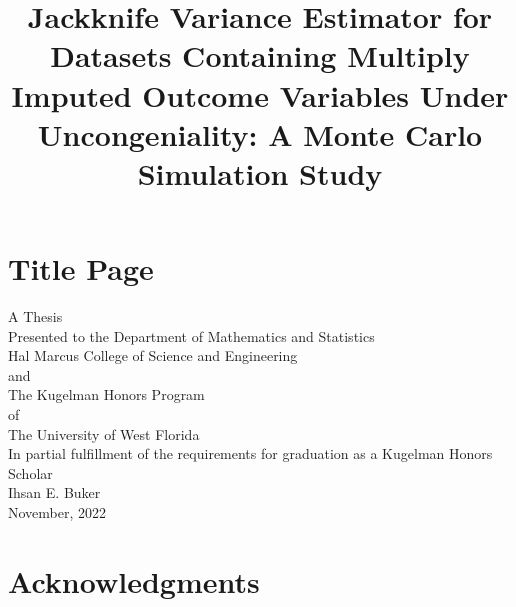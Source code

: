 \documentclass[
  letterpaper,
  DIV=11,
  numbers=noendperiod]{scrreprt}
\title{Jackknife Variance Estimator for Datasets Containing Multiply
Imputed Outcome Variables Under Uncongeniality: A Monte Carlo Simulation
Study}
\author{}
\date{}
\renewcommand*\contentsname{Table of contents}
\newcommand\contentsname{Table of contents}
\begin{document}
\maketitle
\ifdefined\Shaded\renewenvironment{Shaded}{\begin{tcolorbox}[frame hidden, breakable, borderline west={3pt}{0pt}{shadecolor}, enhanced, sharp corners, boxrule=0pt, interior hidden]}{\end{tcolorbox}}\fi

\renewcommand*\contentsname{Table of contents}
{
\setcounter{tocdepth}{2}
\tableofcontents
}

\hypertarget{title-page}{%
\chapter*{\texorpdfstring{{Title Page}}{Title Page}}\label{title-page}}

\begin{center}
A Thesis \\ 

Presented to the Department of Mathematics and Statistics \\ 

Hal Marcus College of Science and Engineering \\ 

and \\ 

The Kugelman Honors Program \\ 

of \\ 

The University of West Florida \\ 

In partial fulfillment of the requirements for graduation as a Kugelman Honors Scholar \\ 

Ihsan E. Buker \\ 

November, 2022

\end{center}


\hypertarget{acknowledgments}{%
\chapter*{Acknowledgments}\label{acknowledgments}}
\end{document}
